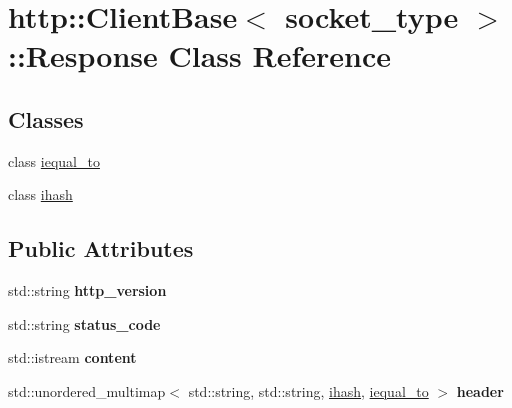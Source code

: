 \hypertarget{classhttp_1_1_client_base_1_1_response}{}\section{http\+:\+:Client\+Base$<$ socket\+\_\+type $>$\+:\+:Response Class Reference}
\label{classhttp_1_1_client_base_1_1_response}
\subsection*{Classes}
\begin{DoxyCompactItemize}
\item 
class \hyperlink{classhttp_1_1_client_base_1_1_response_1_1iequal__to}{iequal\+\_\+to}
\item 
class \hyperlink{classhttp_1_1_client_base_1_1_response_1_1ihash}{ihash}
\end{DoxyCompactItemize}
\subsection*{Public Attributes}
\begin{DoxyCompactItemize}
\item 
\mbox{\label{classhttp_1_1_client_base_1_1_response_a687c7fd5edd098b9165e1f7942e7507a}} 
std\+::string {\bfseries http\+\_\+version}
\item 
\mbox{\label{classhttp_1_1_client_base_1_1_response_a31570138416992c608133d2e9cbbbaa0}} 
std\+::string {\bfseries status\+\_\+code}
\item 
\mbox{\label{classhttp_1_1_client_base_1_1_response_a5b3baa10ac06ca1205e41c4ecb268da2}} 
std\+::istream {\bfseries content}
\item 
\mbox{\label{classhttp_1_1_client_base_1_1_response_af32325b6c18b930f77454c18c96dc5f8}} 
std\+::unordered\+\_\+multimap$<$ std\+::string, std\+::string, \hyperlink{classhttp_1_1_client_base_1_1_response_1_1ihash}{ihash}, \hyperlink{classhttp_1_1_client_base_1_1_response_1_1iequal__to}{iequal\+\_\+to} $>$ {\bfseries header}
\end{DoxyCompactItemize}
